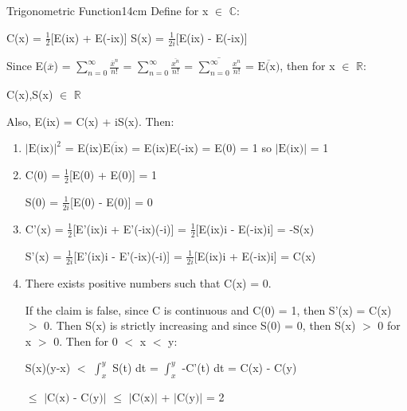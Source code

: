     \begin{definition}{Trigonometric Function}{14cm}
        Define for x $\in$ $\mathbb{C}$:
        
        \hspace{0.5cm}
        C(x) = $\frac{1}{2}$[E(ix) + E(-ix)]
        \hspace{1cm}
        S(x) = $\frac{1}{2i}$[E(ix) - E(-ix)]

        Since E($\overline{x}$) = $\sum_{n=0}^{\infty} \frac{\overline{x}^n}{n!}$
        = $\sum_{n=0}^{\infty} \frac{\overline{x^n}}{n!}$
        = $\overline{\sum_{n=0}^{\infty} \frac{x^n}{n!}}$
        = $\overline{\text{E(x)}}$, then for x $\in$ $\mathbb{R}$:

        \hspace{0.5cm}
        C(x),S(x) $\in$ $\mathbb{R}$

        Also, E(ix) = C(x) + iS(x). Then:

        \begin{enumerate}[label=(\alph*), leftmargin=1.5cm, itemsep=0.1cm]
            \item $|\text{E(ix)}|^2$ = E(ix)$\overline{\text{E(ix)}}$
                = E(ix)E(-ix) = E(0) = 1 so $|\text{E(ix)}|$ = 1

            \item C(0) = $\frac{1}{2}$[E(0) + E(0)] = 1
            
                S(0) = $\frac{1}{2i}$[E(0) - E(0)] = 0

            \item C'(x) = $\frac{1}{2}$[E'(ix)i + E'(-ix)(-i)]
                = $\frac{1}{2}$[E(ix)i - E(-ix)i] = -S(x)

                S'(x) = $\frac{1}{2i}$[E'(ix)i - E'(-ix)(-i)]
                = $\frac{1}{2i}$[E(ix)i + E(-ix)i] = C(x)

            \item There exists positive numbers such that C(x) = 0.
            
                If the claim is false, since C is continuous and C(0) = 1,
                then S'(x) = C(x) $>$ 0. Then S(x) is strictly increasing and
                since S(0) = 0, then S(x) $>$ 0 for x $>$ 0.
                Then for 0 $<$ x $<$ y:

                \hspace{0.5cm}
                S(x)(y-x) $<$ $\int_x^y$ S(t) dt
                = $\int_x^y$ -C'(t) dt
                = C(x) - C(y)

                \hspace{2.3cm}
                $\leq$ $|\text{C(x) - C(y)}|$
                $\leq$ $|\text{C(x)}|$ + $|\text{C(y)}|$ = 2


\end{enumerate}
\end{definition}
